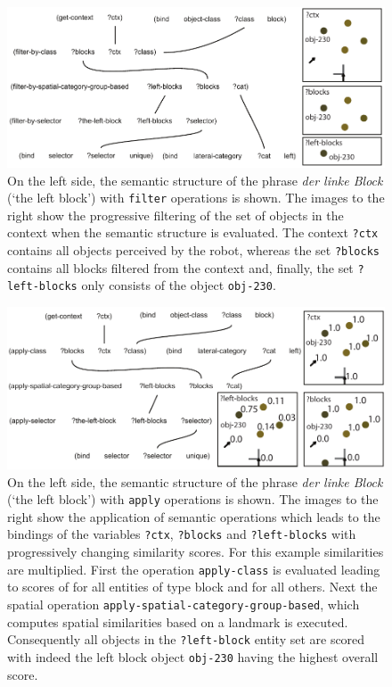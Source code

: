 \begin{figure}
\begin{center}
\includegraphics[width=.8\columnwidth]{figs/semantic-structure-filtering-der-linke-block}
\end{center}
\caption[Category membership semantics]{On the left side, the semantic structure of the phrase 
\textit{der linke Block} (`the left block') with {\footnotesize\tt filter} operations is shown. The images to 
the right show the progressive filtering of the set of objects in the context when the 
semantic structure is evaluated. The context {\footnotesize\tt ?ctx} contains all objects
perceived by the robot, whereas the set {\footnotesize\tt ?blocks} contains all blocks
filtered from the context and, finally, the set {\footnotesize\tt ?left-blocks} 
only consists of the object {\footnotesize\tt obj-230}.}
\label{f:filtering-operations}
\end{figure}

\begin{figure}
\begin{center}
\includegraphics[width=.8\columnwidth]{figs/semantic-structure-apply-der-linke-block}
\end{center}
\caption[Lenient categorization semantics]{%
On the left side, the semantic structure of the phrase
\textit{der linke Block} (`the left block') with {\footnotesize\tt apply} operations is shown. The images to
the right show the application of semantic operations which leads to the
bindings of the variables {\footnotesize\tt ?ctx}, {\footnotesize\tt ?blocks} and {\footnotesize\tt ?left-blocks}
with progressively changing similarity scores. For this example similarities are
multiplied. First the operation {\footnotesize\tt apply-class} is evaluated leading to
scores of for all entities of type block and
for all others. Next the spatial operation {\footnotesize\tt apply-spatial-category-group-based}, 
which computes spatial similarities based on a landmark is executed.
Consequently all objects in the {\footnotesize\tt ?left-block} entity set are scored with
indeed the left block object {\footnotesize\tt obj-230} having the highest
overall score.}
\label{f:apply-operations}
\end{figure}

